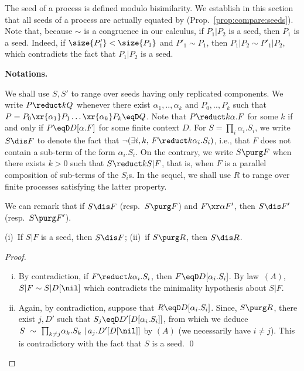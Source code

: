 \documentclass{llncs}
\begin{document}
The seed of a process is defined modulo bisimilarity. We establish in
this section that all seeds of a process are actually equated by
\eqD{} (Prop.~\ref{prop:compare:seeds}).  Note that, because $\sim$ is
a congruence in our calculus, if $P_1|P_2$ is a seed, then $P_1$ is a
seed. Indeed, if $\size{P'_1}<\size{P_1}$ and $P'_1\sim P_1$, then
$P_1|P_2\sim P'_1|P_2$, which contradicts the fact that $P_1|P_2$ is a
seed.

\medskip
\noindent \textbf{Notations.} 

We shall use $S, S'$ to range over seeds having only replicated
components.
We write $P\reduct k Q$ whenever there exist $\alpha_1,..,\alpha_k$
and $P_0,..,P_k$ such that $P=P_0\xr{\alpha_1}P_1\dots
\xr{\alpha_k}P_k\eqD Q$.
Note that $P\reduct k \alpha.F$ for some $k$ if and only if
$P\eqD D[\alpha.F]$ for some finite context $D$.
For $S = \prod_i \!\alpha_i.S_i$, we write $S\dis F$ to denote the
fact that $\neg(\exists i,k,\, F\reduct k \alpha_i.S_i)$, i.e., that
$F$ does not contain a sub-term of the form $\alpha_i.S_i$. On the
contrary, we write $S\purg F$ when there exists $k>0$ such that
$S\reduct k S|F$, that is, when $F$ is a parallel composition of
sub-terms of the $S_i$s. In the sequel, we shall use $R$ to range over
finite processes satisfying the latter property.

We can remark that if $S\dis F$ (resp.\ $S\purg F$) and $F\xr\alpha
F'$, then $S\dis F'$ (resp.\ $S\purg F'$).  

\begin{lem}\label{lem:disprops}
  (i)~If $S|F$ is a seed, then $S\dis F$; 
  (ii)~if $S\purg R$, then $S\dis R$.
\end{lem}
\begin{proof}
  \begin{enumerate}[(i)]
  \item By contradiction, if $F\reduct k \alpha_i.S_i$, then
    $F\eqD D[\alpha_i.S_i]$. By law~$(A)$, $S|F\sim S|D[\nil]$ which
    contradicts the minimality hypothesis about $S|F$.
  \item Again, by contradiction, suppose that $R\eqD D[\alpha_i.S_i]$.
    Since, $S\purg R$, there exist $j,D'$ such that
    $S_j\eqD D'[D[\alpha_i.S_i]]$, from which we deduce
    $S~\sim~\prod_{k\neq j}\!\alpha_k.S_k~|~\!a_j.D'[D[\nil]]$ by $(A)$
    (we necessarily have $i\neq j$). This is contradictory with the
    fact that $S$ is a seed. \qed
  \end{enumerate}
\end{proof}
\end{document}
